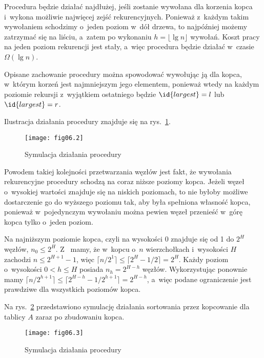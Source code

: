 \exercise %
Procedura  będzie działać najdłużej, jeśli zostanie wywołana dla korzenia kopca i~wykona możliwie najwięcej zejść rekurencyjnych. Ponieważ z~każdym takim wywołaniem schodzimy o~jeden poziom w~dół drzewa, to najpóźniej możemy zatrzymać się na liściu, a~zatem po wykonaniu $h=\lfloor\lg n\rfloor$ wywołań. Koszt pracy na jeden poziom rekurencji jest stały, a~więc procedura będzie działać w~czasie $\Omega(\lg n)$.

Opisane zachowanie procedury można spowodować wywołując ją dla kopca, w~którym korzeń jest najmniejszym jego elementem, ponieważ wtedy na każdym poziomie rekursji z~wyjątkiem ostatniego będzie $\id{largest}=l$ lub $\id{largest}=r$.


\exercise %
Ilustracja działania procedury  znajduje się na rys.~\ref{fig:6.3-1}.
\begin{figure}[ht]
	\begin{center}
		\texttt{[image: fig06.2]}
	\end{center}
	\caption{Symulacja działania procedury } \label{fig:6.3-1}
\end{figure}

\exercise %
Powodem takiej kolejności przetwarzania węzłów jest fakt, że wywołania rekurencyjne procedury  schodzą na coraz niższe poziomy kopca. Jeżeli węzeł o~wysokiej wartości znajduje się na niskich poziomach, to nie byłoby możliwe dostarczenie go do wyższego poziomu tak, aby była spełniona własność kopca, ponieważ w~pojedynczym wywołaniu  można pewien węzeł przenieść w~górę kopca tylko o~jeden poziom.

\exercise %
Na najniższym poziomie kopca, czyli na wysokości 0 znajduje się od 1 do $2^H$ węzłów, $n_0\le2^H$. Z~ mamy, że w~kopcu o~$n$ wierzchołkach i~wysokości $H$ zachodzi $n\le2^{H+1}-1$, więc $\lceil n/2^1\rceil\le\lceil2^H-1/2\rceil=2^H$. Każdy poziom o~wysokości $0<h\le H$ posiada $n_h=2^{H-h}$ węzłów. Wykorzystując ponownie  mamy $\lceil n/2^{h+1}\rceil\le\lceil2^{H-h}-1/2^{h+1}\rceil=2^{H-h}$, a~więc podane ograniczenie jest prawdziwe dla wszystkich poziomów kopca.


\exercise %
Na rys.~\ref{fig:6.4-1} przedstawiono symulację działania sortowania przez kopcowanie dla tablicy $A$ zaraz po zbudowaniu kopca.
\begin{figure}[ht]
	\begin{center}
		\texttt{[image: fig06.3]}
	\end{center}
	\caption{Symulacja działania procedury } \label{fig:6.4-1}
\end{figure}

